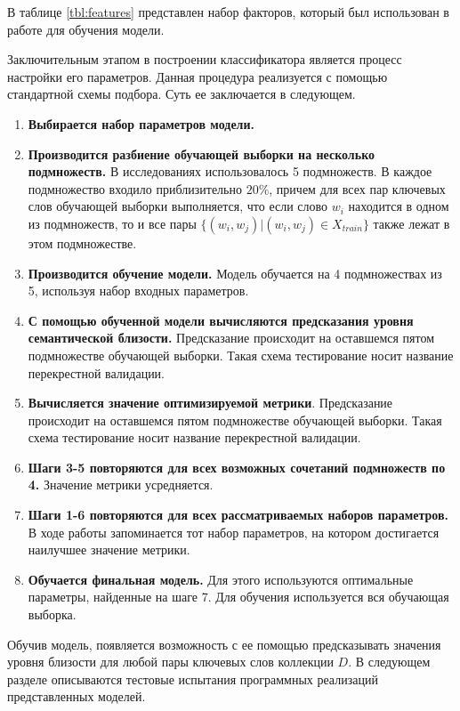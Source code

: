 В таблице \ref{tbl:features} представлен набор факторов, который был использован в работе для обучения модели. 


Заключительным этапом в построении классификатора является процесс настройки его параметров. Данная процедура реализуется с помощью стандартной схемы подбора. Суть ее заключается в следующем.

\begin{enumerate}
    \item \textbf{Выбирается набор параметров модели.}
    \item \textbf{Производится разбиение обучающей выборки на несколько подмножеств.} В исследованиях использовалось 5 подмножеств. В каждое подмножество входило приблизительно $20\%$, причем для всех пар ключевых слов обучающей выборки выполняется, что если слово $w_i$ находится в одном из подмножеств, то и все пары $\{(w_i, w_j) | (w_i, w_j) \in X_{train}\}$ также лежат в этом подмножестве.
    \item \textbf{Производится обучение модели.} Модель обучается на 4 подмножествах из 5, используя набор входных параметров.
    \item \textbf{С помощью обученной модели вычисляются предсказания уровня семантической близости.} Предсказание происходит на оставшемся пятом подмножестве обучающей выборки. Такая схема тестирование носит название перекрестной валидации.
    \item \textbf{Вычисляется значение оптимизируемой метрики}. Предсказание происходит на оставшемся пятом подмножестве обучающей выборки. Такая схема тестирование носит название перекрестной валидации.
    \item \textbf{Шаги 3-5 повторяются для всех возможных сочетаний подмножеств по 4.} Значение метрики усредняется.
    \item \textbf{Шаги 1-6 повторяются для всех рассматриваемых наборов параметров.} В ходе работы запоминается тот набор параметров, на котором достигается наилучшее значение метрики.
    \item \textbf{Обучается финальная модель.} Для этого используются оптимальные параметры, найденные на шаге 7. Для обучения используется вся обучающая выборка.
\end{enumerate}

Обучив модель, появляется возможность с ее помощью предсказывать значения уровня близости для любой пары ключевых слов коллекции $D$. В следующем разделе описываются тестовые испытания программных реализаций представленных моделей.

